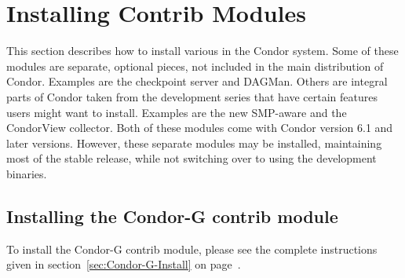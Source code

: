 \section{\label{sec:Contrib-Install}Installing Contrib Modules}

This section describes how to install various 
in the Condor system.
Some of these modules are separate, optional pieces, not included in
the main distribution of Condor.
Examples are the checkpoint server and DAGMan.
Others are integral parts of Condor taken from the development series
that have certain features users might want to install.
Examples are the new SMP-aware  and the CondorView
collector.  
Both of these modules come with Condor version 6.1 and
later versions.
However, 
these separate modules may be installed,
maintaining most of the stable release,
while not
switching over to using the
development binaries.







\subsection{\label{sec:contrib-Install-Condor-G}
Installing the Condor-G contrib module} 

To install the Condor-G contrib module, please see the complete
instructions given in
section~\ref{sec:Condor-G-Install}
on page~\pageref{sec:Condor-G-Install}.

